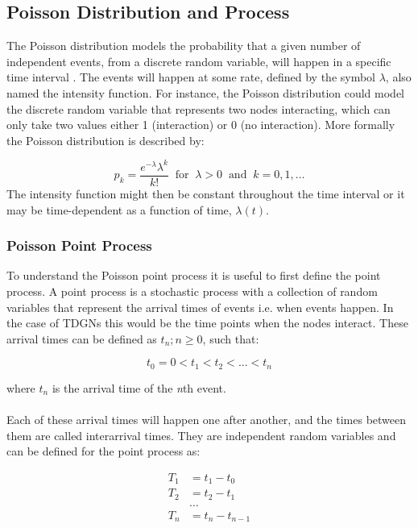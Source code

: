 \subsection{Poisson Distribution and Process}
\label{sec:Method:Poisson}

The Poisson distribution models the probability that a given number of independent events, from a discrete random variable, will happen in a specific time interval \cite{PoissonScience}. 
The events will happen at some rate, defined by the symbol $\lambda$, also named the intensity function. 
For instance, the Poisson distribution could model the discrete random variable that represents two nodes interacting, which can only take two values either 1 (interaction) or 0 (no interaction).
More formally the Poisson distribution is described by:

\begin{equation}
    p_k = \frac{e^{-\lambda}\lambda^k}{k!} \;\; \text{for} \;\; \lambda > 0 \;\; \text{and} \;\; k = 0,1,\dots
\end{equation}
The intensity function might then be constant throughout the time interval or it may be time-dependent as a function of time, $\lambda(t)$.



\subsubsection{Poisson Point Process}
\label{sec:Method:Poisson:PoissonPointProcess}

To understand the Poisson point process it is useful to first define the point process. 
A point process is a stochastic process with a collection of random variables that represent the arrival times of events i.e. when events happen. 
In the case of TDGNs this would be the time points when the nodes interact. 
These arrival times can be defined as ${t_n ; n \ge 0}$, such that:

$$
t_0 = 0 < t_1 < t_2 < ... < t_n
$$

where $t_n$ is the arrival time of the \textit{n}th event.
\\\\
Each of these arrival times will happen one after another, and the times between them are called interarrival times. 
They are independent random variables and can be defined for the point process as:

\begin{align*}
T_1 &= t_1 - t_0 \\
T_2 &= t_2 - t_1 \\
&\dots \\
T_n &= t_n - t_{n-1}
\end{align*}

